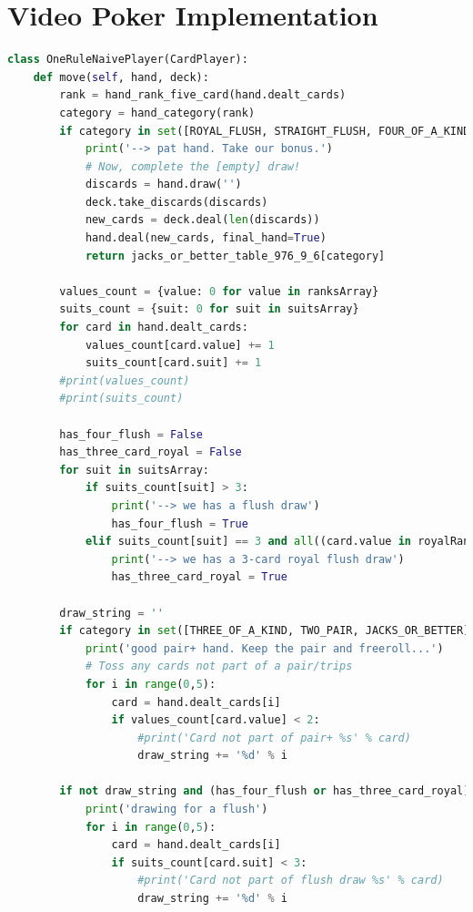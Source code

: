 \documentclass[review]{elsarticle}
\begin{document}
\section{Video Poker Implementation}

\begin{lstlisting}[language=Python, caption=VP]
class OneRuleNaivePlayer(CardPlayer):
    def move(self, hand, deck):
        rank = hand_rank_five_card(hand.dealt_cards)
        category = hand_category(rank)
        if category in set([ROYAL_FLUSH, STRAIGHT_FLUSH, FOUR_OF_A_KIND, FULL_HOUSE, FLUSH, STRAIGHT]):
            print('--> pat hand. Take our bonus.')
            # Now, complete the [empty] draw!
            discards = hand.draw('')
            deck.take_discards(discards)
            new_cards = deck.deal(len(discards))
            hand.deal(new_cards, final_hand=True)
            return jacks_or_better_table_976_9_6[category]

        values_count = {value: 0 for value in ranksArray}
        suits_count = {suit: 0 for suit in suitsArray}
        for card in hand.dealt_cards:
            values_count[card.value] += 1
            suits_count[card.suit] += 1
        #print(values_count)
        #print(suits_count)

        has_four_flush = False
        has_three_card_royal = False
        for suit in suitsArray:
            if suits_count[suit] > 3:
                print('--> we has a flush draw')
                has_four_flush = True
            elif suits_count[suit] == 3 and all((card.value in royalRanksSet) or (card.suit != suit) for card in hand.dealt_cards):
                print('--> we has a 3-card royal flush draw')
                has_three_card_royal = True
                
        draw_string = ''
        if category in set([THREE_OF_A_KIND, TWO_PAIR, JACKS_OR_BETTER]):
            print('good pair+ hand. Keep the pair and freeroll...')
            # Toss any cards not part of a pair/trips
            for i in range(0,5):
                card = hand.dealt_cards[i]
                if values_count[card.value] < 2:
                    #print('Card not part of pair+ %s' % card)
                    draw_string += '%d' % i
        
        if not draw_string and (has_four_flush or has_three_card_royal):
            print('drawing for a flush')
            for i in range(0,5):
                card = hand.dealt_cards[i]
                if suits_count[card.suit] < 3:
                    #print('Card not part of flush draw %s' % card)
                    draw_string += '%d' % i


\end{lstlisting}
\end{document}
